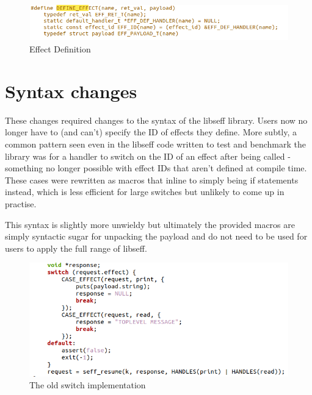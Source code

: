 \documentclass[logo,bsc,singlespacing,parskip,online]{infthesis}
\begin{document}
\begin{figure}[h]
    \centering
    \includegraphics[width=1\linewidth]{defeff.png}
    \caption{Effect Definition}
    \label{fig:joooo}
\end{figure}

\section{Syntax changes}

These changes required changes to the syntax of the libseff library. Users now no longer have to (and can't) specify the ID of effects they define. More subtly, a common pattern seen even in the libseff code written to test and benchmark the library was for a handler to switch on the ID of an effect after being called - something no longer possible with effect IDs that aren't defined at compile time. These cases were rewritten as macros that inline to simply being if statements instead, which is less efficient for large switches but unlikely to come up in practise.

This syntax is slightly more unwieldy but ultimately the provided macros are simply syntactic sugar for unpacking the payload and do not need to be used for users to apply the full range of libseff.

\begin{figure}[h]
    \centering
    \includegraphics[width=1\linewidth]{oldswitch.png}
    \caption{The old switch implementation}
    \label{fig:oldswitch}
\end{figure}
\end{document}
